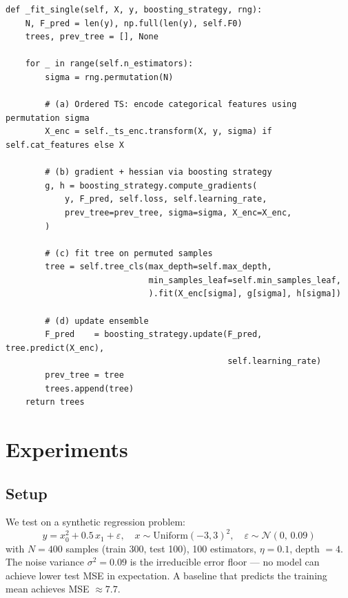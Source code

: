 \documentclass[11pt, a4paper]{article}
\begin{document}
\begin{listing}[H]
\caption{Training loop in \texttt{model.py} (\texttt{\_fit\_single}, simplified)}
\begin{verbatim}
def _fit_single(self, X, y, boosting_strategy, rng):
    N, F_pred = len(y), np.full(len(y), self.F0)
    trees, prev_tree = [], None

    for _ in range(self.n_estimators):
        sigma = rng.permutation(N)

        # (a) Ordered TS: encode categorical features using permutation sigma
        X_enc = self._ts_enc.transform(X, y, sigma) if self.cat_features else X

        # (b) gradient + hessian via boosting strategy
        g, h = boosting_strategy.compute_gradients(
            y, F_pred, self.loss, self.learning_rate,
            prev_tree=prev_tree, sigma=sigma, X_enc=X_enc,
        )

        # (c) fit tree on permuted samples
        tree = self.tree_cls(max_depth=self.max_depth,
                             min_samples_leaf=self.min_samples_leaf,
                             ).fit(X_enc[sigma], g[sigma], h[sigma])

        # (d) update ensemble
        F_pred    = boosting_strategy.update(F_pred, tree.predict(X_enc),
                                             self.learning_rate)
        prev_tree = tree
        trees.append(tree)
    return trees
\end{verbatim}
\end{listing}

\section{Experiments}

\subsection{Setup}

We test on a synthetic regression problem:
\[
y = x_0^2 + 0.5\,x_1 + \varepsilon,\quad
x \sim \mathrm{Uniform}(-3, 3)^2,\quad
\varepsilon \sim \mathcal{N}(0,\, 0.09)
\]
with $N = 400$ samples (train 300, test 100), 100 estimators, $\eta = 0.1$,
depth $= 4$. The noise variance $\sigma^2 = 0.09$ is the irreducible
error floor --- no model can achieve lower test MSE in expectation.
A baseline that predicts the training mean achieves MSE $\approx 7.7$.
\end{document}
